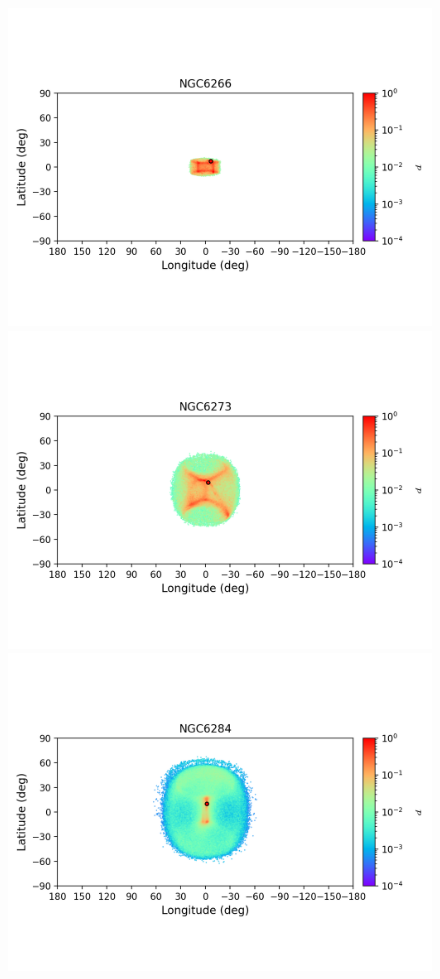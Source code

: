         \begin{figure}
        \includegraphics[clip=true, trim = 0mm 20mm 0mm 10mm, width=1\columnwidth]{images/error_plots_NGC6266.png}
        \includegraphics[clip=true, trim = 0mm 20mm 0mm 10mm, width=1\columnwidth]{images/error_plots_NGC6273.png}
        \includegraphics[clip=true, trim = 0mm 20mm 0mm 10mm, width=1\columnwidth]{images/error_plots_NGC6284.png}

\end{figure}

